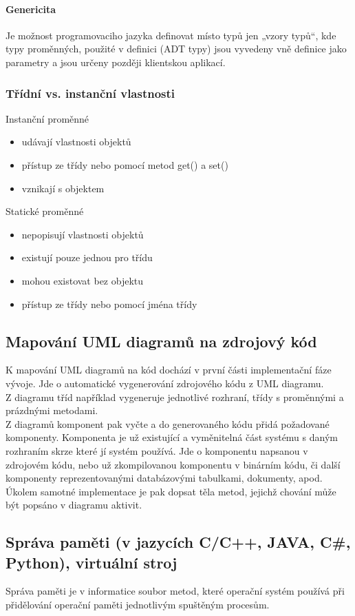 \documentclass[10pt,a4paper]{article}
\begin{document}
\paragraph{Genericita}
Je možnost programovaciho jazyka definovat místo typů jen „vzory typů“, kde typy proměnných, použité v definici (ADT typy) jsou vyvedeny vně definice jako parametry a jsou určeny později klientskou aplikací.
\subsubsection{Třídní vs. instanční vlastnosti}
Instanční proměnné
\begin{itemize}
\item udávají vlastnosti objektů
\item přístup ze třídy nebo pomocí metod get() a set()
\item vznikají s objektem
\end{itemize}
Statické proměnné
\begin{itemize}
\item nepopisují vlastnosti objektů
\item existují pouze jednou pro třídu
\item mohou existovat bez objektu
\item přístup ze třídy nebo pomocí jména třídy
\end{itemize}
\subsection{Mapování UML diagramů na zdrojový kód}
K mapování UML diagramů na kód dochází v první části implementační fáze vývoje. Jde o automatické vygenerování zdrojového kódu z UML diagramu. \\
Z diagramu tříd například vygeneruje jednotlivé rozhraní, třídy s proměnnými a prázdnými metodami.\\
Z diagramů komponent pak vyčte a do generovaného kódu přidá požadované komponenty. Komponenta je už existující a vyměnitelná část systému s daným rozhraním skrze které jí systém používá. Jde o komponentu napsanou v zdrojovém kódu, nebo už zkompilovanou komponentu v binárním kódu, či další komponenty reprezentovanými databázovými tabulkami, dokumenty, apod. \\
Úkolem samotné implementace je pak dopsat těla metod, jejichž chování může být popsáno v diagramu aktivit.
\subsection{Správa paměti (v jazycích C/C++, JAVA, C\#, Python), virtuální stroj}
Správa paměti je v informatice soubor metod, které operační systém používá při přidělování operační paměti jednotlivým spuštěným procesům. \\
\end{document}
